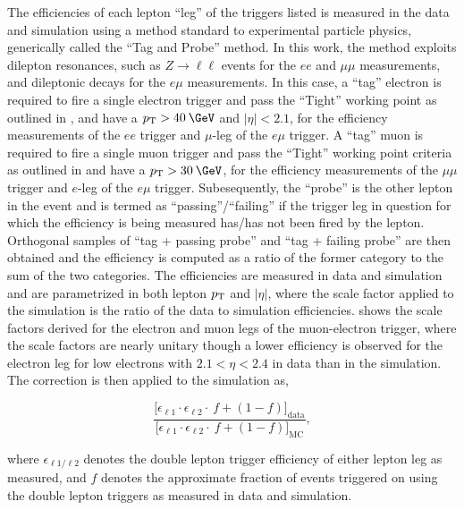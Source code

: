 The efficiencies of each lepton ``leg'' of the triggers listed is measured in the data and simulation using a method standard to experimental particle physics, generically called the ``Tag and Probe'' method. In this work, the method exploits dilepton resonances, such as $Z\rightarrow\ell\ell$ events for the $ee$ and $\mu\mu$ measurements, and dileptonic \ttll decays for the $e\mu$ measurements. In this case, a ``tag'' electron is required to fire a single electron trigger and pass the ``Tight'' working point as outlined in , and have a $\pt>40\:\GeV$ and $|\eta|<2.1$, for the efficiency measurements of the $ee$ trigger and $\mu$-leg of the $e\mu$ trigger. A ``tag'' muon is required to fire a single muon trigger and pass the ``Tight'' working point criteria as outlined in  and have a $\pt>30\:\GeV$, for the efficiency measurements of the $\mu\mu$ trigger and $e$-leg of the $e\mu$ trigger. Subesequently, the ``probe'' is the other lepton in the event and is termed as ``passing''/``failing'' if the trigger leg in question for which the efficiency is being measured has/has not been fired by the lepton. Orthogonal samples of ``tag + passing probe'' and ``tag + failing probe'' are then obtained and the efficiency is computed as a ratio of the former category to the sum of the two categories. The efficiencies are measured in data and simulation and are parametrized in both lepton $p_{\mathrm{T}}$ and $|\eta|$, where the scale factor applied to the simulation is the ratio of the data to simulation efficiencies.  shows the scale factors derived for the electron and muon legs of the muon-electron trigger, where the scale factors are nearly unitary though a lower efficiency is observed for the electron leg for low \pt electrons with $2.1<\eta<2.4$ in data than in the simulation. The correction is then applied to the simulation as,

\begin{equation}
 \frac{ {\Big[\epsilon_{\ell1}\cdot\epsilon_{\ell2}\cdot\:f + (1-f)\Big]}_\text{data}}{ {\Big[\epsilon_{\ell1}\cdot\epsilon_{\ell2}\cdot\:f + (1-f)\Big]}_\text{MC}},  
\end{equation} 

where $\epsilon_{\ell1/\ell2}$ denotes the double lepton trigger efficiency of either lepton leg as measured, and $f$ denotes the approximate fraction of events triggered on using the double lepton triggers as measured in data and simulation.

